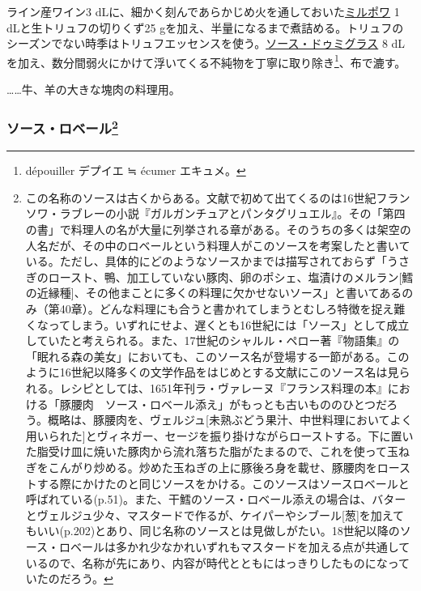 \begin{recette}

 

ライン産ワイン3
dLに、細かく刻んであらかじめ火を通しておいた\protect\hyperlink{mirepoix}{ミルポワ}
1 dLと生トリュフの切りくず25
gを加え、半量になるまで煮詰める。トリュフのシーズンでない時季はトリュフエッセンスを使う。\protect\hyperlink{sauce-demi-glace}{ソース・ドゥミグラス}
8 dLを加え、数分間弱火にかけて浮いてくる不純物を丁寧に取り除き\footnote{dépouiller
  デプイエ ≒ écumer エキュメ。}、布で漉す。

\ldots{}\ldots{}牛、羊の大きな塊肉の料理用。

\atoaki{}

\hypertarget{sauce-robert}{%
\subsubsection[ソース・ロベール]{\texorpdfstring{ソース・ロベール\footnote{この名称のソースは古くからある。文献で初めて出てくるのは16世紀フランソワ・ラブレーの小説『ガルガンチュアとパンタグリュエル』。その「第四の書」で料理人の名が大量に列挙される章がある。そのうちの多くは架空の人名だが、その中のロベールという料理人がこのソースを考案したと書いている。ただし、具体的にどのようなソースかまでは描写されておらず「うさぎのロースト、鴨、加工していない豚肉、卵のポシェ、塩漬けのメルラン{[}鱈の近縁種{]}、その他まことに多くの料理に欠かせないソース」と書いてあるのみ（第40章）。どんな料理にも合うと書かれてしまうとむしろ特徴を捉え難くなってしまう。いずれにせよ、遅くとも16世紀には「ソース」として成立していたと考えられる。また、17世紀のシャルル・ペロー著『物語集』の「眠れる森の美女」においても、このソース名が登場する一節がある。このように16世紀以降多くの文学作品をはじめとする文献にこのソース名は見られる。レシピとしては、1651年刊ラ・ヴァレーヌ『フランス料理の本』における「豚腰肉　ソース・ロベール添え」がもっとも古いもののひとつだろう。概略は、豚腰肉を、ヴェルジュ{[}未熟ぶどう果汁、中世料理においてよく用いられた{]}とヴィネガー、セージを振り掛けながらローストする。下に置いた脂受け皿に焼いた豚肉から流れ落ちた脂がたまるので、これを使って玉ねぎをこんがり炒める。炒めた玉ねぎの上に豚後ろ身を載せ、豚腰肉をローストする際にかけたのと同じソースをかける。このソースはソースロベールと呼ばれている(p.51)。また、干鱈のソース・ロベール添えの場合は、バターとヴェルジュ少々、マスタードで作るが、ケイパーやシブール{[}葱{]}を加えてもいい(p.202)とあり、同じ名称のソースとは見做しがたい。18世紀以降のソース・ロベールは多かれ少なかれいずれもマスタードを加える点が共通しているので、名称が先にあり、内容が時代とともにはっきりしたものになっていたのだろう。}}{ソース・ロベール}}\label{sauce-robert}}


\end{recette}
